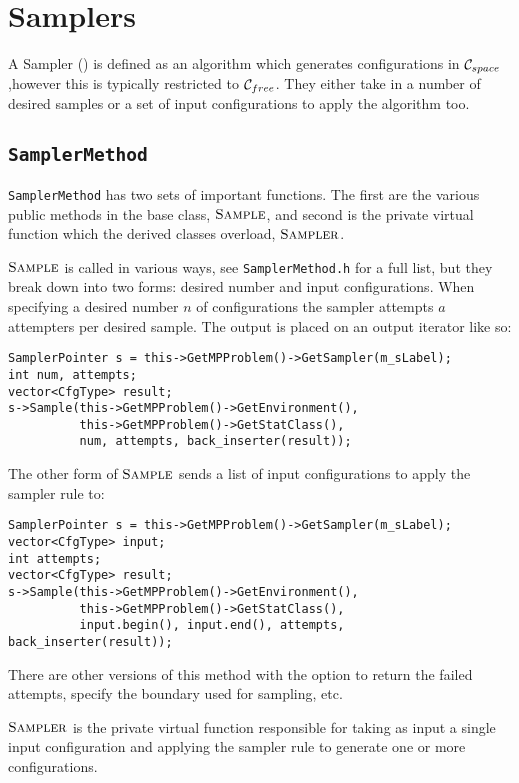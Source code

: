 \chapter{Samplers}

A Sampler (\samp) is defined as an algorithm which generates configurations in
$\mathcal{C}_{space}$,however this is typically restricted to $\mathcal{C}_{free}$. They either take in
a number of desired samples or a set of input configurations to apply the
algorithm too.

\section{\texttt{SamplerMethod}}

\texttt{SamplerMethod} has two sets of important functions. The first are the
various public methods in the base class, $\textsc{Sample}$, and second is the
private virtual function which the derived classes overload, $\textsc{Sampler}$.

$\textsc{Sample}$ is called in various ways, see \texttt{SamplerMethod.h} for a
full list, but they break down into two forms: desired number and input
configurations. When specifying a desired number $n$ of configurations the
sampler attempts $a$ attempters per desired sample. The output is placed on an
output iterator like so:
\begin{lstlisting}
SamplerPointer s = this->GetMPProblem()->GetSampler(m_sLabel);
int num, attempts;
vector<CfgType> result;
s->Sample(this->GetMPProblem()->GetEnvironment(),
          this->GetMPProblem()->GetStatClass(),
          num, attempts, back_inserter(result));
\end{lstlisting}
The other form of $\textsc{Sample}$ sends a list of input configurations to apply
the sampler rule to:
\begin{lstlisting}
SamplerPointer s = this->GetMPProblem()->GetSampler(m_sLabel);
vector<CfgType> input;
int attempts;
vector<CfgType> result;
s->Sample(this->GetMPProblem()->GetEnvironment(),
          this->GetMPProblem()->GetStatClass(),
          input.begin(), input.end(), attempts, back_inserter(result));
\end{lstlisting}
There are other versions of this method with the option to return the failed
attempts, specify the boundary used for sampling, etc.

$\textsc{Sampler}$ is the private virtual function responsible for taking as input
a single input configuration and applying the sampler rule to generate one or
more configurations.


